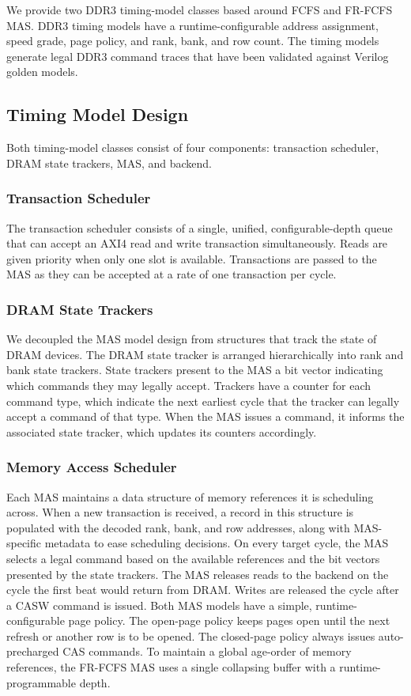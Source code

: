 We provide two DDR3 timing-model classes based around FCFS and FR-FCFS MAS.
DDR3 timing models have a runtime-configurable address assignment, speed grade,
page policy, and rank, bank, and row count. The timing models generate legal
DDR3 command traces that have been validated against Verilog golden models.

\subsection{Timing Model Design}
Both timing-model classes consist of four components: transaction
scheduler, DRAM state trackers, MAS, and backend.

\subsubsection{Transaction Scheduler}
The transaction scheduler consists of a single, unified, configurable-depth
queue that can accept an AXI4 read and write transaction simultaneously. Reads
are given priority when only one slot is available.  Transactions are passed to
the MAS as they can be accepted at a rate of one transaction per cycle.

\subsubsection{DRAM State Trackers}
We decoupled the MAS model design from structures that track the state
of DRAM devices. The DRAM state tracker is arranged hierarchically into rank and
bank state trackers. State trackers present to the MAS a bit vector indicating
which commands they may legally accept. Trackers have a counter for each command
type, which indicate the next earliest cycle that the tracker can legally accept a command of
that type. When the MAS issues a command, it informs the associated state tracker,
which updates its counters accordingly.

\subsubsection{Memory Access Scheduler}
Each MAS maintains a data structure of memory references it is scheduling across.
When a new transaction is received, a record in this structure is populated with the decoded rank, bank, and row addresses, along with
MAS-specific metadata to ease scheduling decisions.
On every target cycle, the MAS
selects a legal command based on the available references and the bit vectors
presented by the state trackers. The MAS releases reads to the backend on the
cycle the first beat would return from DRAM. Writes are released the cycle after a
CASW command is issued.  Both MAS models have a simple, runtime-configurable
page policy. The open-page policy keeps pages open until the next refresh or another row
is to be opened. The closed-page policy always issues auto-precharged CAS
commands. To maintain a global age-order of memory references, the FR-FCFS MAS
uses a single collapsing buffer with a runtime-programmable depth.


